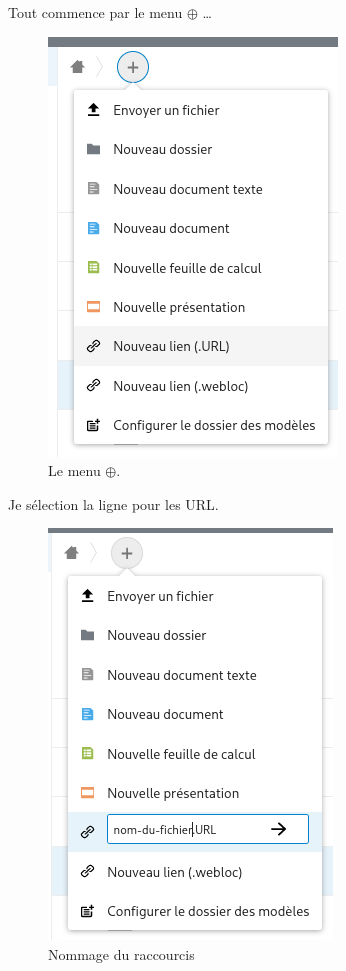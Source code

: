\begin{multicols}{2}
Tout commence par le menu $\oplus$ \ldots
\begin{figure}
	\centering
	\includegraphics{./Captures/nuage.menu.plus.zoom.png}
	\caption{Le menu $\oplus$.}
\end{figure}
\columnbreak

Je sélection la ligne pour les URL.
\begin{figure}
	\centering
	\includegraphics{./Captures/nuage.menu.plus.creer.url.png}
	\caption{Nommage du raccourcis}
\end{figure}
\end{multicols}

